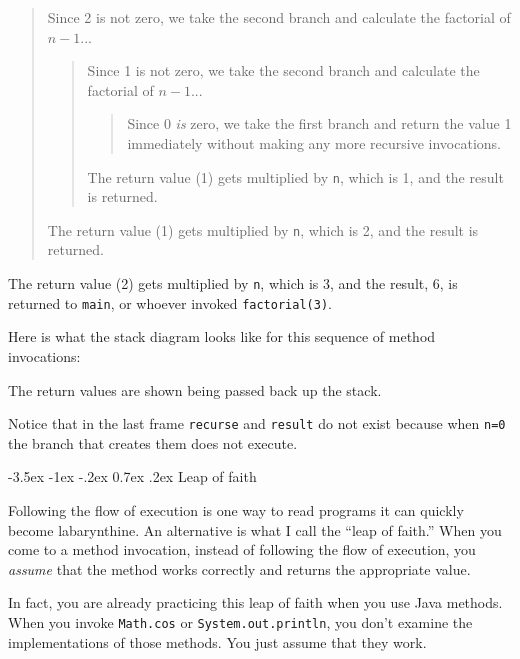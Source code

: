 \documentclass{book}
\makeatletter
\renewcommand{\section}{\@startsection 
    {section} {1} {0mm}%
    {-3.5ex \@plus -1ex \@minus -.2ex}%
    {0.7ex \@plus.2ex}%
    {\normalfont\Large\bfseries}}
\makeatother
\begin{document}
\begin{quote}
Since 2 is not zero, we take the second branch and calculate
the factorial of $n-1$...

\begin{quote}
Since 1 is not zero, we take the second branch and calculate
the factorial of $n-1$...

\begin{quote}
Since 0 {\em is} zero, we take the first branch and return
the value 1 immediately without making any more recursive
invocations.

\end{quote}

The return value (1) gets multiplied by {\tt n}, which is 1,
and the result is returned.

\end{quote}

The return value (1) gets multiplied by {\tt n}, which is 2,
and the result is returned.

\end{quote}

\noindent The return value (2) gets multiplied by {\tt n}, which is 3,
and the result, 6, is returned to {\tt main}, or whoever
invoked {\tt factorial(3)}.


Here is what the stack diagram looks like for this sequence of
method invocations:



%
The return values are shown being passed back up the stack.

Notice that in the last frame {\tt recurse} and {\tt result} do not
exist because when {\tt n=0} the branch that creates them does not
execute.


\section{Leap of faith}

Following the flow of execution is one way to read programs it can
quickly become labarynthine.  An alternative is what I call the ``leap
of faith.''  When you come to a method invocation, instead of
following the flow of execution, you {\em assume} that the method
works correctly and returns the appropriate value.

In fact, you are already practicing this leap of faith
when you use Java methods.  When you invoke {\tt Math.cos}
or {\tt System.out.println}, you don't examine the implementations of 
those methods.  You just assume that they work.
\end{document}
